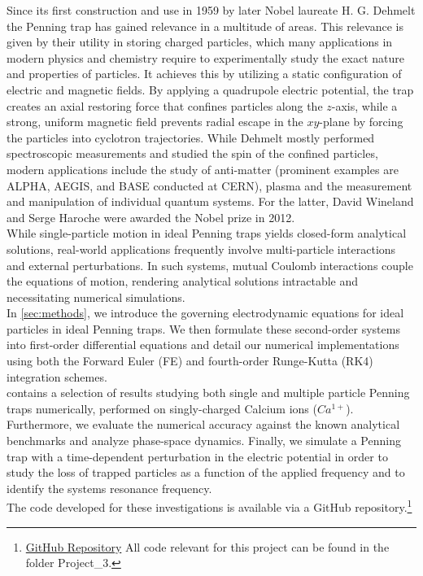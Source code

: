 \documentclass[english,notitlepage,reprint,nofootinbib]{revtex4-2}  %
\begin{document}
Since its first construction and use in 1959 by later Nobel laureate H. G. Dehmelt the Penning trap has gained relevance in a multitude of areas. 
This relevance is given by their utility in storing charged particles, which many applications in modern physics and chemistry require to experimentally study the exact nature and properties of particles. 
It achieves this by utilizing a static configuration of electric and magnetic fields.
By applying a quadrupole electric potential, the trap creates an axial restoring force that confines particles along the $z$-axis, while a strong, uniform magnetic field prevents radial escape in the $xy$-plane by forcing the particles into cyclotron trajectories.
While Dehmelt mostly performed spectroscopic measurements and studied the spin of the confined particles, modern applications include the study of anti-matter (prominent examples are ALPHA, AEGIS, and BASE conducted at CERN), plasma and the measurement and manipulation of individual quantum systems. For the latter, David Wineland and Serge Haroche were awarded the Nobel prize in 2012. \cite{PenningTrapbook} \\
While single-particle motion in ideal Penning traps yields closed-form analytical solutions, real-world applications frequently involve multi-particle interactions and external perturbations. In such systems, mutual Coulomb interactions couple the equations of motion, rendering analytical solutions intractable and necessitating numerical simulations. \\
In \cref{sec:methods}, we introduce the governing electrodynamic equations for ideal particles in ideal Penning traps.
We then formulate these second-order systems into first-order differential equations and detail our numerical implementations using both the Forward Euler (FE) and fourth-order Runge-Kutta (RK4) integration schemes. \\
 contains a selection of results studying both single and multiple particle Penning traps numerically, performed on singly-charged Calcium ions ($Ca^{1+}$). 
Furthermore, we evaluate the numerical accuracy against the known analytical benchmarks and analyze phase-space dynamics. Finally, we simulate a Penning trap with a time-dependent perturbation in the electric potential in order to study the loss of trapped particles as a function of the applied frequency and to identify the systems resonance frequency. \\
The code developed for these investigations is available via a GitHub repository.\footnote{\href{https://github.uio.no/johascha/CompPhys/tree/master}{GitHub Repository} All code relevant for this project can be found in the folder Project\_3.}
\end{document}
